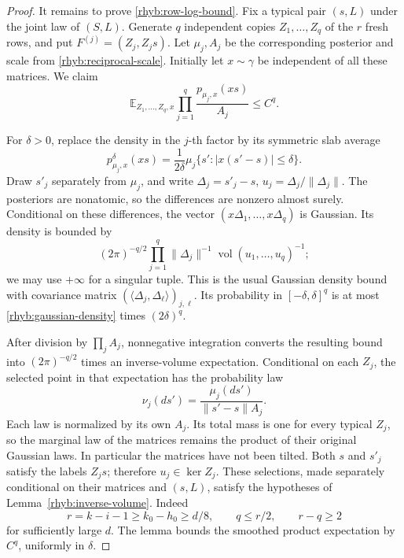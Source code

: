\begin{proof}
It remains to prove \eqref{rhyb:row-log-bound}.  Fix a typical pair
\((s,L)\) under the joint law of \((S,L)\).  Generate \(q\) independent
copies \(Z_1,\ldots,Z_q\) of the \(r\) fresh rows, and put
\(F^{(j)}=(Z_j,Z_js)\).  Let \(\mu_j,A_j\) be the corresponding
posterior and scale from \eqref{rhyb:reciprocal-scale}.  Initially let
\(x\sim\gamma\) be independent of all these matrices.  We claim
\begin{equation}\label{rhyb:product-moment}
 \mathbb E_{Z_1,\ldots,Z_q,x}
 \prod_{j=1}^q\frac{p_{\mu_j,x}(xs)}{A_j}\le C^q.
\end{equation}

For \(\delta>0\), replace the density in the \(j\)-th factor by its
symmetric slab average
\[
 p^\delta_{\mu_j,x}(xs)
 =\frac{1}{2\delta}
 \mu_j\{s':|x(s'-s)|\le\delta\}.
\]
Draw \(s'_j\) separately from \(\mu_j\), and write
\(\Delta_j=s'_j-s\), \(u_j=\Delta_j/\|\Delta_j\|\).  The posteriors are
nonatomic, so the differences are nonzero almost surely.  Conditional on
these differences, the vector
\((x\Delta_1,\ldots,x\Delta_q)\) is Gaussian.  Its density is bounded by
\begin{equation}\label{rhyb:gaussian-density}
 (2\pi)^{-q/2}
 \prod_{j=1}^q\|\Delta_j\|^{-1}
 \operatorname{vol}(u_1,\ldots,u_q)^{-1};
\end{equation}
we may use \(+\infty\) for a singular tuple.  This is the usual Gaussian
density bound with covariance matrix
\((\langle\Delta_j,\Delta_\ell\rangle)_{j,\ell}\).
Its probability in \([-\delta,\delta]^q\) is at most
\eqref{rhyb:gaussian-density} times \((2\delta)^q\).

After division by \(\prod_j A_j\), nonnegative integration converts the
resulting bound into \((2\pi)^{-q/2}\) times an inverse-volume expectation.
Conditional on each \(Z_j\), the selected point in that expectation has
the probability law
\begin{equation}\label{rhyb:normalized-kernel}
 \nu_j(ds')=\frac{\mu_j(ds')}{\|s'-s\|A_j}.
\end{equation}
Each law is normalized by its own \(A_j\).  Its total mass is one for
every typical \(Z_j\), so the marginal law of the matrices remains the
product of their original Gaussian laws.  In particular the matrices
have not been tilted.  Both \(s\) and \(s'_j\) satisfy the labels \(Z_js\);
therefore \(u_j\in\ker Z_j\).  These selections, made separately
conditional on their matrices and \((s,L)\), satisfy the hypotheses of
Lemma~\ref{rhyb:inverse-volume}.  Indeed
\[
 r=k-i-1\ge k_0-h_0\ge d/8,\qquad q\le r/2,\qquad r-q\ge2
\]
for sufficiently large \(d\).  The lemma bounds the smoothed product
expectation by \(C^q\), uniformly in \(\delta\).


\end{proof}
